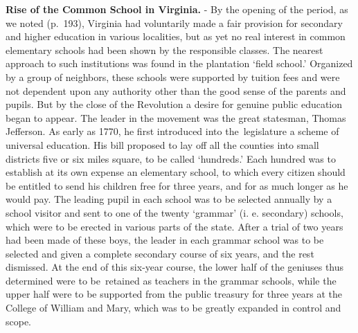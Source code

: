 \documentclass[]{book}
\begin{document}
\textbf{Rise of the Common School in Virginia.} - By the opening of the period, as we noted (p.~193), Virginia had voluntarily made a fair provision for secondary and higher education in various localities, but as yet no real interest in common elementary schools had been shown by the responsible classes. The nearest approach to such institutions was found in the plantation `field school.' Organized by a group of neighbors, these schools were supported by tuition fees and were not dependent upon any authority other than the good sense of the parents and pupils. But by the close of the Revolution a desire for genuine public education began to appear. The leader in the movement was the great statesman, Thomas Jefferson. As early as 1770, he first introduced into the~legislature a scheme of universal education. His bill proposed to lay off all the counties into small districts five or six miles square, to be called `hundreds.' Each hundred was to establish at its own expense an elementary school, to which every citizen should be entitled to send his children free for three years, and for as much longer as he would pay. The leading pupil in each school was to be selected annually by a school visitor and sent to one of the twenty `grammar' (i. e. secondary) schools, which were to be erected in various parts of the state. After a trial of two years had been made of these boys, the leader in each grammar school was to be selected and given a complete secondary course of six years, and the rest dismissed. At the end of this six-year course, the lower half of the geniuses thus determined were to be~retained as teachers in the grammar schools, while the upper half were to be supported from the public treasury for three years at the College of William and Mary, which was to be greatly expanded in control and scope.
\end{document}
